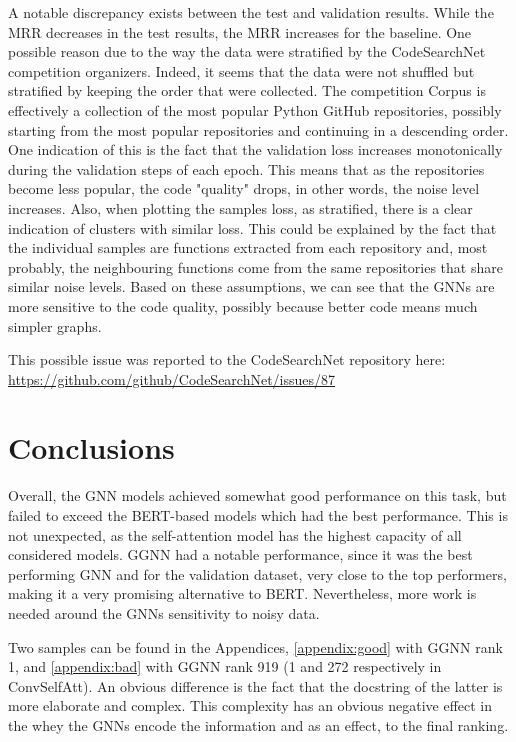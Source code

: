 \documentclass{article}
\begin{document}
A notable discrepancy exists between the test and validation results. While the MRR decreases in the test results, the MRR increases for the baseline. One possible reason due to the way the data were stratified by the CodeSearchNet competition organizers. Indeed, it seems that the data were not shuffled but stratified by keeping the order that were collected. The competition Corpus is effectively a collection of the most popular Python GitHub repositories, possibly starting from the most popular repositories and continuing in a descending order. One indication of this is the fact that the validation loss increases monotonically during the validation steps of each epoch. This means that as the repositories become less popular, the code "quality" drops, in other words, the noise level increases.
Also, when plotting the samples loss, as stratified, there is a clear indication of clusters with similar loss. This could be explained by the fact that the individual samples are functions extracted from each repository and, most probably, the neighbouring functions come from the same repositories that share similar noise levels.
Based on these assumptions, we can see that the GNNs are more sensitive to the code quality, possibly because better code means much simpler graphs.

This possible issue was reported to the CodeSearchNet repository here:  \url{https://github.com/github/CodeSearchNet/issues/87}

\section{Conclusions}
Overall, the GNN models achieved somewhat good performance on this task, but failed to exceed the BERT-based models which had the best performance. This is not unexpected, as the self-attention model has the highest capacity of all considered models. GGNN had a notable performance, since it was the best performing GNN and for the validation dataset, very close to the top performers, making it a very promising alternative to BERT. Nevertheless, more work is needed around the GNNs sensitivity to noisy data.

Two samples can be found in the Appendices, \autoref{appendix:good} with GGNN rank 1, and \autoref{appendix:bad} with GGNN rank 919 (1 and 272 respectively in ConvSelfAtt). An obvious difference is the fact that the docstring of the latter is more elaborate and complex. This complexity has an obvious negative effect in the whey the GNNs encode the information and as an effect, to the final ranking.
\end{document}
